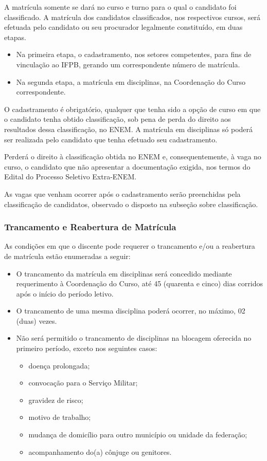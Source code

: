 	A matrícula somente se dará no curso e turno para o qual o candidato foi classificado. A matrícula dos candidatos classificados, nos respectivos cursos, será efetuada pelo candidato ou seu procurador legalmente constituído, em duas etapas. 
	\begin{itemize}
		\item Na primeira etapa, o cadastramento, nos setores competentes, para fins de vinculação ao IFPB, gerando um correspondente número de matrícula.
		\item Na segunda etapa, a matrícula em disciplinas, na Coordenação do Curso correspondente.
	\end{itemize}

	O cadastramento é obrigatório, qualquer que tenha sido a opção de curso em que o candidato tenha obtido classificação, sob pena de perda do direito aos resultados dessa classificação, no ENEM. A matrícula em disciplinas só poderá ser realizada pelo candidato que tenha efetuado seu cadastramento.

	Perderá o direito à classificação obtida no ENEM e, consequentemente, à vaga no curso, o candidato que não apresentar a documentação exigida, nos termos do Edital do Processo Seletivo Extra-ENEM.

	As vagas que venham ocorrer após o cadastramento serão preenchidas pela classificação de candidatos, observado o disposto na subseção sobre classificação.

\subsubsection{Trancamento e Reabertura de Matrícula}

	As condições em que o discente pode requerer o trancamento e/ou a reabertura de matrícula estão enumeradas a seguir:

\begin{itemize}	
	\item O trancamento da matrícula em disciplinas será concedido mediante requerimento à Coordenação do Curso, até 45 (quarenta e cinco) dias corridos após o início do período letivo.

	\item O trancamento de uma mesma disciplina poderá ocorrer, no máximo, 02 (duas) vezes.

	\item Não será permitido o trancamento de disciplinas na blocagem oferecida no primeiro período, exceto nos seguintes casos:
	\begin{itemize}
		\item doença prolongada;
		\item convocação para o Serviço Militar;
		\item gravidez de risco;
		\item motivo de trabalho;
		\item mudança de domicílio para outro município ou unidade da federação; 
		\item acompanhamento do(a) cônjuge ou genitores.
	\end{itemize}
\end{itemize}

